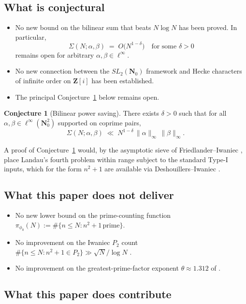 \documentclass[11pt]{article}
\theoremstyle{definition}
\newtheorem{conjecture}[theorem]{Conjecture}
\newcommand{\Nz}{\mathbf{N}_0}
\newcommand{\Z}{\mathbf{Z}}
\newcommand{\SLNz}{SL_2(\Nz)}
\begin{document}
\subsection*{What is conjectural}

\begin{itemize}
\item No new bound on the bilinear sum that beats $N\log N$ has been
proved. In particular,
\[
\Sigma(N;\alpha,\beta)\;=\;O\!\bigl(N^{1-\delta}\bigr)\quad
\text{for some }\delta>0
\]
remains open for arbitrary $\alpha,\beta\in\ell^{\infty}$.
\item No new connection between the $\SLNz$ framework and Hecke
characters of infinite order on $\Z[i]$ has been established.
\item The principal Conjecture~\ref{conj:bilinear-power-saving} below
remains open.
\end{itemize}

\begin{conjecture}[Bilinear power saving]
\label{conj:bilinear-power-saving}
There exists $\delta>0$ such that for all
$\alpha,\beta\in\ell^{\infty}(\Nz^{2})$ supported on coprime pairs,
\[
\Sigma(N;\alpha,\beta)\;\ll\;N^{1-\delta}\,\|\alpha\|_{\infty}
\,\|\beta\|_{\infty}.
\]
\end{conjecture}

A proof of Conjecture~\ref{conj:bilinear-power-saving} would, by the
asymptotic sieve of Friedlander--Iwaniec \cite{FI98a}, place
Landau's fourth problem within range subject to the standard Type-I
inputs, which for the form $n^{2}+1$ are available via Deshouillers--Iwaniec
\cite{deshouillers-iwaniec82}.

\subsection*{What this paper does not deliver}

\begin{itemize}
\item No new lower bound on the prime-counting function
$\pi_{\phi_{0}}(N):=\#\{n\le N:n^{2}+1\,\text{prime}\}$.
\item No improvement on the Iwaniec $P_{2}$ count
$\#\{n\le N:n^{2}+1\in P_{2}\}\gg \sqrt{N}/\log N$ \cite{iwaniec78}.
\item No improvement on the greatest-prime-factor exponent
$\theta\approx 1.312$ of \cite{grimmelt-merikoski25}.
\end{itemize}

\subsection*{What this paper does contribute}
\end{document}
